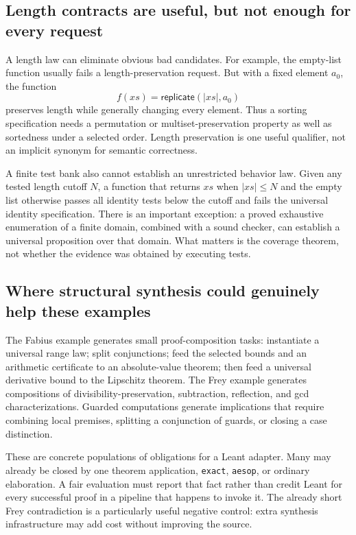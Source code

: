 \documentclass[11pt,a4paper]{article}
\theoremstyle{definition}
\theoremstyle{remark}
\newcommand{\code}[1]{\texttt{#1}}
\begin{document}
\subsection{Length contracts are useful, but not enough for every request}
A length law can eliminate obvious bad candidates. For example, the empty-list function usually fails a length-preservation request. But with a fixed element $a_0$, the function
\[
 f(xs)=\mathsf{replicate}(|xs|,a_0)
\]
preserves length while generally changing every element. Thus a sorting specification needs a permutation or multiset-preservation property as well as sortedness under a selected order. Length preservation is one useful qualifier, not an implicit synonym for semantic correctness.

A finite test bank also cannot establish an unrestricted behavior law. Given any tested length cutoff $N$, a function that returns $xs$ when $|xs|\le N$ and the empty list otherwise passes all identity tests below the cutoff and fails the universal identity specification. There is an important exception: a proved exhaustive enumeration of a finite domain, combined with a sound checker, can establish a universal proposition over that domain. What matters is the coverage theorem, not whether the evidence was obtained by executing tests.

\subsection{Where structural synthesis could genuinely help these examples}
The Fabius example generates small proof-composition tasks: instantiate a universal range law; split conjunctions; feed the selected bounds and an arithmetic certificate to an absolute-value theorem; then feed a universal derivative bound to the Lipschitz theorem. The Frey example generates compositions of divisibility-preservation, subtraction, reflection, and gcd characterizations. Guarded computations generate implications that require combining local premises, splitting a conjunction of guards, or closing a case distinction.

These are concrete populations of obligations for a Leant adapter. Many may already be closed by one theorem application, \code{exact}, \code{aesop}, or ordinary elaboration. A fair evaluation must report that fact rather than credit Leant for every successful proof in a pipeline that happens to invoke it. The already short Frey contradiction is a particularly useful negative control: extra synthesis infrastructure may add cost without improving the source.
\end{document}
